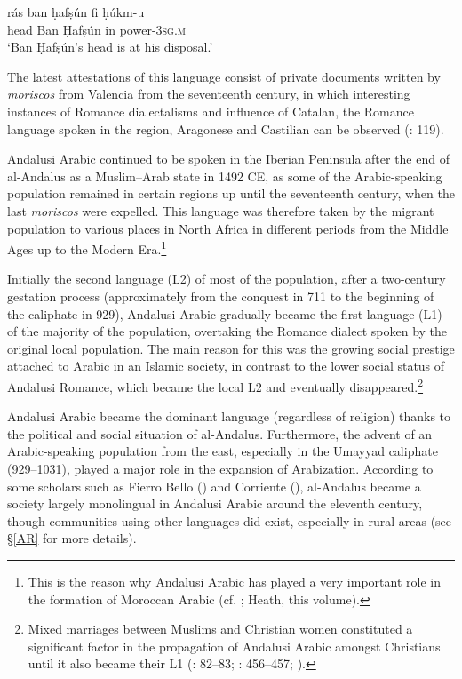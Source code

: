 \documentclass[output=paper,modfonts,nonflat]{langsci/langscibook}
\begin{document}
\ex
\gll rás ban ḥafṣún fi ḥúkm-u \\
head Ban Ḥafṣún in power-\textsc{3sg.m}\\
\glt ‘Ban Ḥafṣún’s head is at his disposal.’
\z
\z

The latest attestations of this language consist of private documents written by \textit{moriscos} from Valencia from the seventeenth century, in which interesting instances of Romance dialectalisms and influence of Catalan, the Romance language spoken in the region, Aragonese and Castilian can be observed (\citealt{BarcelóLabarta2009}: 119).

Andalusi Arabic continued to be spoken in the Iberian Peninsula after the end of al-Andalus as a Muslim–Arab state in 1492 CE, as some of the Arabic-speaking population remained in certain regions up until the seventeenth century, when the last \textit{moriscos} were expelled. This language was therefore taken by the migrant population to various places in North Africa in different periods from the Middle Ages up to the Modern Era.\footnote{This is the reason why Andalusi Arabic has played a very important role in the formation of Moroccan Arabic (cf. \citealt{Vicente2010}; Heath, this volume).} 

Initially the second language (L2) of most of the population, after a two-century gestation process (approximately from the conquest in 711 to the beginning of the caliphate in 929), Andalusi Arabic gradually became the first language (L1) of the majority of the population, overtaking the Romance dialect spoken by the original local population. The main reason for this was the growing social prestige attached to Arabic in an Islamic society, in contrast to the lower social status of Andalusi Romance, which became the local L2 and eventually disappeared.\footnote{Mixed marriages between Muslims and Christian women constituted a significant factor in the propagation of Andalusi Arabic amongst Christians until it also became their L1 (\citealt{Guichard1989}: 82–83; \citeyear{Guichard1995}: 456–457; \citealt{Chalmeta2003}).}  

Andalusi Arabic became the dominant language (regardless of religion) thanks to the political and social situation of al-Andalus. Furthermore, the advent of an Arabic-speaking population from the east, especially in the Umayyad caliphate (929--1031), played a major role in the expansion of Arabization. According to some scholars such as Fierro Bello (\citeyear{FierroBello2001}) and Corriente (\citeyear[104]{Corriente2008}), al-Andalus became a society largely monolingual in Andalusi Arabic around the eleventh century, though communities using other languages did exist, especially in rural areas (see §\ref{AR} for more details). 
\end{document}
